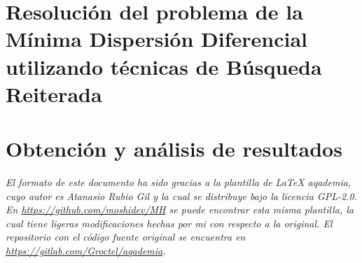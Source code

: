 \documentclass[10pt, a4paper]{aqademic}
\begin{document}
\chapter{Resolución del problema de la Mínima Dispersión Diferencial utilizando técnicas de Búsqueda Reiterada}
    

\chapter{Obtención y análisis de resultados}
    




\vspace*{\fill}

\textit{%
El formato de este documento ha sido gracias a la plantilla de \LaTeX{} aqademia, cuyo autor es Atanasio Rubio Gil y la
cual se distribuye bajo la licencia GPL-2.0. En \url{https://github.com/moshidev/MH} se puede encontrar esta misma plantilla,
la cual tiene ligeras modificaciones hechas por mi con respecto a la original.
El repositorio con el código fuente original se encuentra en \url{https://gitlab.com/Groctel/aqademia}.
}
\end{document}
